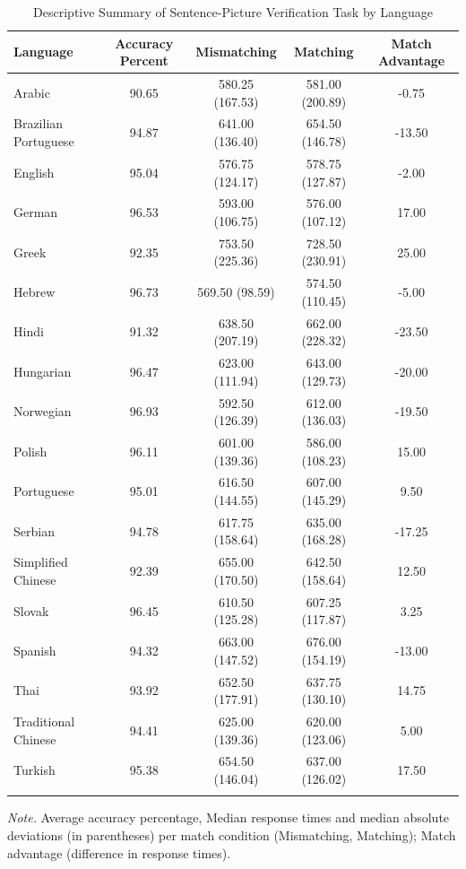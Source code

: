 \documentclass[
  man,mask,floatsintext]{apa7}
\begin{document}
\begin{table}[tbp]

\begin{center}
\begin{threeparttable}

\caption{\label{tab:summary-languages}Descriptive Summary of Sentence-Picture Verification Task by Language}

\begin{tabular}{lcccc}
\toprule
Language & Accuracy Percent & Mismatching & Matching & Match Advantage\\
\midrule
Arabic & 90.65 & 580.25 (167.53) & 581.00 (200.89) & -0.75\\
Brazilian Portuguese & 94.87 & 641.00 (136.40) & 654.50 (146.78) & -13.50\\
English & 95.04 & 576.75 (124.17) & 578.75 (127.87) & -2.00\\
German & 96.53 & 593.00 (106.75) & 576.00 (107.12) & 17.00\\
Greek & 92.35 & 753.50 (225.36) & 728.50 (230.91) & 25.00\\
Hebrew & 96.73 & 569.50 (98.59) & 574.50 (110.45) & -5.00\\
Hindi & 91.32 & 638.50 (207.19) & 662.00 (228.32) & -23.50\\
Hungarian & 96.47 & 623.00 (111.94) & 643.00 (129.73) & -20.00\\
Norwegian & 96.93 & 592.50 (126.39) & 612.00 (136.03) & -19.50\\
Polish & 96.11 & 601.00 (139.36) & 586.00 (108.23) & 15.00\\
Portuguese & 95.01 & 616.50 (144.55) & 607.00 (145.29) & 9.50\\
Serbian & 94.78 & 617.75 (158.64) & 635.00 (168.28) & -17.25\\
Simplified Chinese & 92.39 & 655.00 (170.50) & 642.50 (158.64) & 12.50\\
Slovak & 96.45 & 610.50 (125.28) & 607.25 (117.87) & 3.25\\
Spanish & 94.32 & 663.00 (147.52) & 676.00 (154.19) & -13.00\\
Thai & 93.92 & 652.50 (177.91) & 637.75 (130.10) & 14.75\\
Traditional Chinese & 94.41 & 625.00 (139.36) & 620.00 (123.06) & 5.00\\
Turkish & 95.38 & 654.50 (146.04) & 637.00 (126.02) & 17.50\\
\bottomrule
\addlinespace
\end{tabular}

\begin{tablenotes}[para]
\normalsize{\textit{Note.} Average accuracy percentage, Median response times and median absolute deviations (in parentheses) per match condition (Mismatching, Matching); Match advantage (difference in response times).}
\end{tablenotes}

\end{threeparttable}
\end{center}

\end{table}
\end{document}
